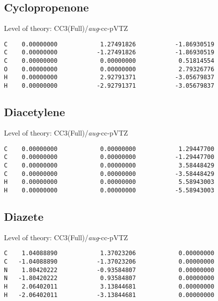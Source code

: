 \documentclass[journal=jctcce,manuscript=article,layout=traditional]{achemso}
\newcommand{\AVTZ}{\emph{aug}-cc-pVTZ}
\begin{document}
\subsection*{Cyclopropenone}

\begin{singlespace}
Level of theory: CC3(Full)/{\AVTZ}
\begin{verbatim}
C    0.00000000            1.27491826           -1.86930519
C    0.00000000           -1.27491826           -1.86930519
C    0.00000000            0.00000000            0.51814554
O    0.00000000            0.00000000            2.79326776
H    0.00000000            2.92791371           -3.05679837
H    0.00000000           -2.92791371           -3.05679837
\end{verbatim}
\end{singlespace}

\subsection*{Diacetylene}

\begin{singlespace}
Level of theory: CC3(Full)/{\AVTZ}
\begin{verbatim}
C    0.00000000            0.00000000            1.29447700
C    0.00000000            0.00000000           -1.29447700
C    0.00000000            0.00000000            3.58448429
C    0.00000000            0.00000000           -3.58448429
H    0.00000000            0.00000000            5.58943003
H    0.00000000            0.00000000           -5.58943003
\end{verbatim}
\end{singlespace}

\subsection*{Diazete}

\begin{singlespace}
Level of theory: CC3(Full)/{\AVTZ}
\begin{verbatim}
C    1.04088890            1.37023206            0.00000000
C   -1.04088890           -1.37023206            0.00000000
N    1.80420222           -0.93584807            0.00000000
N   -1.80420222            0.93584807            0.00000000
H    2.06402011            3.13844681            0.00000000
H   -2.06402011           -3.13844681            0.00000000
\end{verbatim}
\end{singlespace}
\end{document}
